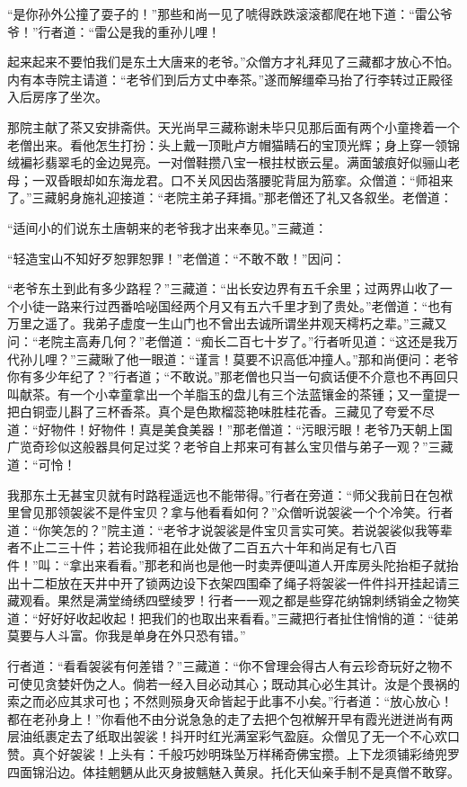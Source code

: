 \documentclass[12pt,UTF8]{ctexbook}
\begin{document}
{“是你孙外公撞了耍子的！”那些和尚一见了唬得跌跌滚滚都爬在地下道：“雷公爷爷！”行者道：“雷公是我的重孙儿哩！

起来起来不要怕我们是东土大唐来的老爷。”众僧方才礼拜见了三藏都才放心不怕。内有本寺院主请道：“老爷们到后方丈中奉茶。”遂而解缰牵马抬了行李转过正殿径入后房序了坐次。

那院主献了茶又安排斋供。天光尚早三藏称谢未毕只见那后面有两个小童搀着一个老僧出来。看他怎生打扮：头上戴一顶毗卢方帽猫睛石的宝顶光辉；身上穿一领锦绒褊衫翡翠毛的金边晃亮。一对僧鞋攒八宝一根拄杖嵌云星。满面皱痕好似骊山老母；一双昏眼却如东海龙君。口不关风因齿落腰驼背屈为筋挛。众僧道：“师祖来了。”三藏躬身施礼迎接道：“老院主弟子拜揖。”那老僧还了礼又各叙坐。老僧道：

“适间小的们说东土唐朝来的老爷我才出来奉见。”三藏道：

“轻造宝山不知好歹恕罪恕罪！”老僧道：“不敢不敢！”因问：

“老爷东土到此有多少路程？”三藏道：“出长安边界有五千余里；过两界山收了一个小徒一路来行过西番哈咇国经两个月又有五六千里才到了贵处。”老僧道：“也有万里之遥了。我弟子虚度一生山门也不曾出去诚所谓坐井观天樗朽之辈。”三藏又问：“老院主高寿几何？”老僧道：“痴长二百七十岁了。”行者听见道：“这还是我万代孙儿哩？”三藏瞅了他一眼道：“谨言！莫要不识高低冲撞人。”那和尚便问：老爷你有多少年纪了？”行者道；“不敢说。”那老僧也只当一句疯话便不介意也不再回只叫献茶。有一个小幸童拿出一个羊脂玉的盘儿有三个法蓝镶金的茶锺；又一童提一把白铜壶儿斟了三杯香茶。真个是色欺榴蕊艳味胜桂花香。三藏见了夸爱不尽道：“好物件！好物件！真是美食美器！”那老僧道：“污眼污眼！老爷乃天朝上国广览奇珍似这般器具何足过奖？老爷自上邦来可有甚么宝贝借与弟子一观？”三藏道：“可怜！

我那东土无甚宝贝就有时路程遥远也不能带得。”行者在旁道：“师父我前日在包袱里曾见那领袈裟不是件宝贝？拿与他看看如何？”众僧听说袈裟一个个冷笑。行者道：“你笑怎的？”院主道：“老爷才说袈裟是件宝贝言实可笑。若说袈裟似我等辈者不止二三十件；若论我师祖在此处做了二百五六十年和尚足有七八百件！”叫：“拿出来看看。”那老和尚也是他一时卖弄便叫道人开库房头陀抬柜子就抬出十二柜放在天井中开了锁两边设下衣架四围牵了绳子将袈裟一件件抖开挂起请三藏观看。果然是满堂绮绣四壁绫罗！行者一一观之都是些穿花纳锦刺绣销金之物笑道：“好好好收起收起！把我们的也取出来看看。”三藏把行者扯住悄悄的道：“徒弟莫要与人斗富。你我是单身在外只恐有错。”

行者道：“看看袈裟有何差错？”三藏道：“你不曾理会得古人有云珍奇玩好之物不可使见贪婪奸伪之人。倘若一经入目必动其心；既动其心必生其计。汝是个畏祸的索之而必应其求可也；不然则殒身灭命皆起于此事不小矣。”行者道：“放心放心！都在老孙身上！”你看他不由分说急急的走了去把个包袱解开早有霞光迸迸尚有两层油纸裹定去了纸取出袈裟！抖开时红光满室彩气盈庭。众僧见了无一个不心欢口赞。真个好袈裟！上头有：千般巧妙明珠坠万样稀奇佛宝攒。上下龙须铺彩绮兜罗四面锦沿边。体挂魍魉从此灭身披魑魅入黄泉。托化天仙亲手制不是真僧不敢穿。

}
\end{document}
